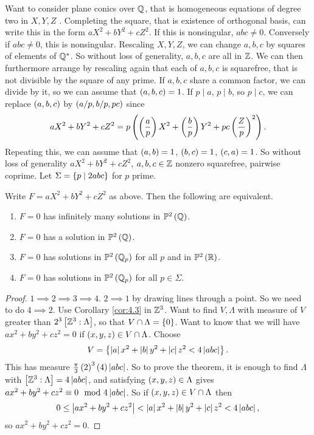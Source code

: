 Want to consider plane conics over $ \mathbb{Q} $, that is homogeneous equations of degree two in $ X, Y, Z $ . Completing the square, that is existence of orthogonal basis, can write this in the form $ aX^2 + bY^2 + cZ^2 $. If this is nonsingular, $ abc \ne 0 $. Conversely if $ abc \ne 0 $, this is nonsingular. Rescaling $ X, Y, Z $, we can change $ a, b, c $ by squares of elements of $ \mathbb{Q}^* $. So without loss of generality, $ a, b, c $ are all in $ \mathbb{Z} $. We can then furthermore arrange by rescaling again that each of $ a, b, c $ is squarefree, that is not divisible by the square of any prime. If $ a, b, c $ share a common factor, we can divide by it, so we can assume that $ \left( a, b, c \right) = 1 $. If $ p \mid a $, $ p \mid b $, so $ p \mid c $, we can replace $ \left( a, b, c \right) $ by $ \left( a / p, b / p, pc \right) $ since
$$ aX^2 + bY^2 + cZ^2 = p\left( \left( \dfrac{a}{p} \right)X^2 + \left( \dfrac{b}{p} \right)Y^2 + pc\left( \dfrac{Z}{p} \right)^2 \right). $$
Repeating this, we can assume that $ \left( a, b \right) = 1 $, $ \left( b, c \right) = 1 $, $ \left( c, a \right) = 1 $. So without loss of generality $ aX^2 + bY^2 + cZ^2 $, $ a, b, c \in \mathbb{Z} $ nonzero squarefree, pairwise coprime. Let $ \Sigma = \left\{ p \mid 2abc \right\} $ for $ p $ prime.

\begin{lemma}
Write $ F = aX^2 + bY^2 + cZ^2 $ as above. Then the following are equivalent.
\begin{enumerate}
\item $ F = 0 $ has infinitely many solutions in $ \mathbb{P}^2\left( \mathbb{Q} \right) $.
\item $ F = 0 $ has a solution in $ \mathbb{P}^2\left( \mathbb{Q} \right) $.
\item $ F = 0 $ has solutions in $ \mathbb{P}^2\left( \mathbb{Q}_p \right) $ for all $ p $ and in $ \mathbb{P}^2\left( \mathbb{R} \right) $.
\item $ F = 0 $ has solutions in $ \mathbb{P}^2\left( \mathbb{Q}_p \right) $ for all $ p \in \Sigma $.
\end{enumerate}
\end{lemma}

\begin{proof}
$ 1 \implies 2 \implies 3 \implies 4 $. $ 2 \implies 1 $ by drawing lines through a point. So we need to do $ 4 \implies 2 $. Use Corollary \ref{cor:4.3} in $ \mathbb{Z}^3 $. Want to find $ V, \Lambda $ with measure of $ V $ greater than $ 2^3\left[ \mathbb{Z}^3 : \Lambda \right] $, so that $ V \cap \Lambda = \left\{ 0 \right\} $. Want to know that we will have $ ax^2 + by^2 + cz^2 = 0 $ if $ \left( x, y, z \right) \in V \cap \Lambda $. Choose
$$ V = \left\{ \left\lvert a \right\rvert x^2 + \left\lvert b \right\rvert y^2 + \left\lvert c \right\rvert z^2 < 4\left\lvert abc \right\rvert \right\}. $$
This has measure $ \tfrac{\pi}{3}\left( 2 \right)^3\left( 4 \right)\left\lvert abc \right\rvert $. So to prove the theorem, it is enough to find $ \Lambda $ with $ \left[ \mathbb{Z}^3 : \Lambda \right] = 4\left\lvert abc \right\rvert $, and satisfying $ \left( x, y, z \right) \in \Lambda $ gives $ ax^2 + by^2 + cz^2 \equiv 0 \mod 4\left\lvert abc \right\rvert $. So if $ \left( x, y, z \right) \in V \cap \Lambda $ then
$$ 0 \le \left\lvert ax^2 + by^2 + cz^2 \right\rvert < \left\lvert a \right\rvert x^2 + \left\lvert b \right\rvert y^2 + \left\lvert c \right\rvert z^2 < 4\left\lvert abc \right\rvert, $$
so $ ax^2 + by^2 + cz^2 = 0 $.
\end{proof}

